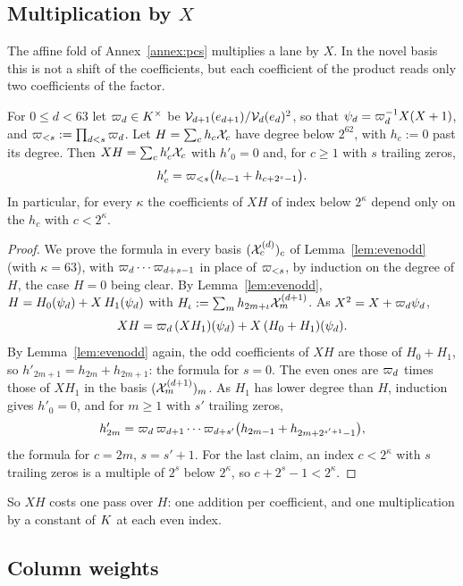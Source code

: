 \subsection{Multiplication by \texorpdfstring{$X$}{X}}\label{sec:ntt-mulx}

The affine fold of Annex~\ref{annex:pcs} multiplies a lane by $X$. In the novel basis this is not a shift of the coefficients, but each coefficient of the product reads only two coefficients of the factor.

\begin{lemma}\label{lem:mulx}
For $0\le d<63$ let $\varpi_d\in K^\times$ be $\mathcal{V}_{d+1}(e_{d+1})/\mathcal{V}_d(e_d)^2$, so that $\psi_d=\varpi_d^{-1}X(X+1)$, and $\varpi_{<s}:=\prod_{d<s}\varpi_d$. Let $H=\sum_ch_c\mathcal{X}_c$ have degree below $2^{62}$, with $h_c:=0$ past its degree. Then $XH=\sum_ch'_c\mathcal{X}_c$ with $h'_0=0$ and, for $c\ge1$ with $s$ trailing zeros,
\[
h'_c=\varpi_{<s}\bigl(h_{c-1}+h_{c+2^s-1}\bigr).
\]
In particular, for every $\kappa$ the coefficients of $XH$ of index below $2^\kappa$ depend only on the $h_c$ with $c<2^\kappa$.
\end{lemma}

\begin{proof}
We prove the formula in every basis $(\mathcal{X}^{(d)}_c)_c$ of Lemma~\ref{lem:evenodd} (with $\kappa=63$), with $\varpi_d\cdots\varpi_{d+s-1}$ in place of $\varpi_{<s}$, by induction on the degree of $H$, the case $H=0$ being clear. By Lemma~\ref{lem:evenodd}, $H=H_0(\psi_d)+X\,H_1(\psi_d)$ with $H_\iota:=\sum_mh_{2m+\iota}\mathcal{X}^{(d+1)}_m$. As $X^2=X+\varpi_d\psi_d$,
\[
XH=\varpi_d\,(XH_1)(\psi_d)+X\,(H_0+H_1)(\psi_d).
\]
By Lemma~\ref{lem:evenodd} again, the odd coefficients of $XH$ are those of $H_0+H_1$, so $h'_{2m+1}=h_{2m}+h_{2m+1}$: the formula for $s=0$. The even ones are $\varpi_d$ times those of $XH_1$ in the basis $(\mathcal{X}^{(d+1)}_m)_m$. As $H_1$ has lower degree than $H$, induction gives $h'_0=0$, and for $m\ge1$ with $s'$ trailing zeros,
\[
h'_{2m}=\varpi_d\,\varpi_{d+1}\cdots\varpi_{d+s'}\bigl(h_{2m-1}+h_{2m+2^{s'+1}-1}\bigr),
\]
the formula for $c=2m$, $s=s'+1$. For the last claim, an index $c<2^\kappa$ with $s$ trailing zeros is a multiple of $2^s$ below $2^\kappa$, so $c+2^s-1<2^\kappa$.
\end{proof}

So $XH$ costs one pass over $H$: one addition per coefficient, and one multiplication by a constant of $K$ at each even index.

\subsection{Column weights}\label{sec:ntt-weights}

